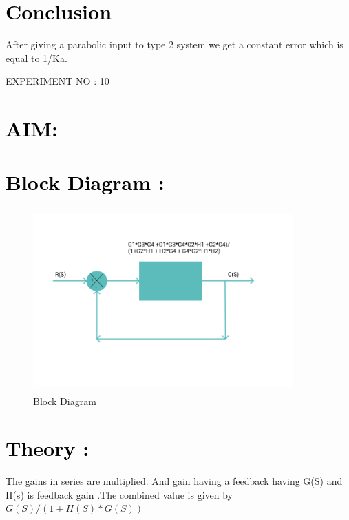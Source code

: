 \documentclass[12pt]{article}
\begin{document}
\section*{\textcolor{black}{Conclusion}}
After giving a parabolic input to type 2 system we get a constant error which is equal to 1/Ka.
 
 \pagebreak
 \begin{center}
    \LARGE {EXPERIMENT NO : 10}
             
\end{center}

\section*{\textcolor{black}{AIM:}}

\section*{\textcolor{black}{Block Diagram :}}

\begin{figure}[!hth]
        \centering
        \includegraphics[width =10cm, height = 7cm]{images/Transfer funstion.png}
        \caption{Block Diagram}
        \label{Graph}
\end{figure}

\section*{\textcolor{black}{Theory :}}The gains in series are multiplied. And gain having a feedback having G(S) and H(s) is feedback gain .The combined value is given by $ G(S)/(1+H(S)*G(S)) $
 \par
\end{document}
